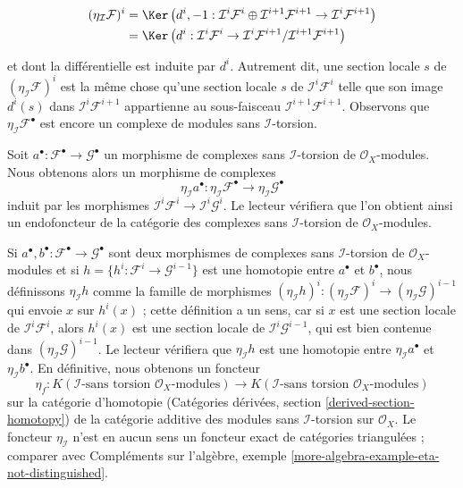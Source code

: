 \begin{align*}
(\eta_\mathcal{I}\mathcal{F})^i
& =
\Ker\left(
d^i, -1 :
\mathcal{I}^i\mathcal{F}^i \oplus \mathcal{I}^{i + 1}\mathcal{F}^{i + 1}
\to
\mathcal{I}^i\mathcal{F}^{i + 1}
\right) \\
& =
\Ker\left(d^i :
\mathcal{I}^i\mathcal{F}^i
\to
\mathcal{I}^i\mathcal{F}^{i + 1}/
\mathcal{I}^{i + 1}\mathcal{F}^{i + 1}
\right)
\end{align*}

et dont la différentielle est induite par $d^i$. Autrement dit, une section locale
$s$ de $(\eta_\mathcal{I}\mathcal{F})^i$ est la même chose qu'une section locale
$s$ de $\mathcal{I}^i\mathcal{F}^i$ telle que son image $d^i(s)$
dans $\mathcal{I}^i\mathcal{F}^{i + 1}$ appartienne au sous-faisceau
$\mathcal{I}^{i + 1}\mathcal{F}^{i + 1}$. Observons que $\eta_\mathcal{I}\mathcal{F}^\bullet$
est encore un complexe de modules sans $\mathcal{I}$-torsion.

\medskip\noindent
Soit $a^\bullet : \mathcal{F}^\bullet \to \mathcal{G}^\bullet$ un morphisme de complexes sans $\mathcal{I}$-torsion de $\mathcal{O}_X$-modules. Nous obtenons alors un morphisme de complexes $$
\eta_\mathcal{I} a^\bullet :
\eta_\mathcal{I}\mathcal{F}^\bullet
\longrightarrow
\eta_\mathcal{I}\mathcal{G}^\bullet
$$ induit par les morphismes $\mathcal{I}^i\mathcal{F}^i \to \mathcal{I}^i\mathcal{G}^i$. Le lecteur vérifiera que l'on obtient ainsi un endofoncteur de la catégorie des complexes sans $\mathcal{I}$-torsion de $\mathcal{O}_X$-modules.

\medskip\noindent

Si $a^\bullet, b^\bullet : \mathcal{F}^\bullet \to \mathcal{G}^\bullet$
sont deux morphismes de complexes sans $\mathcal{I}$-torsion de $\mathcal{O}_X$-modules et si $h = \{h^i : \mathcal{F}^i \to \mathcal{G}^{i - 1}\}$ est une homotopie entre $a^\bullet$ et $b^\bullet$, nous définissons
$\eta_\mathcal{I}h$ comme la famille de morphismes
$(\eta_\mathcal{I}h)^i : (\eta_\mathcal{I}\mathcal{F})^i \to
(\eta_\mathcal{I}\mathcal{G})^{i - 1}$
qui envoie $x$ sur $h^i(x)$ ; cette définition a un sens, car si
$x$ est une section locale de $\mathcal{I}^i\mathcal{F}^i$,
alors $h^i(x)$ est une section locale de $\mathcal{I}^i\mathcal{G}^{i - 1}$,
qui est bien contenue dans $(\eta_\mathcal{I}\mathcal{G})^{i - 1}$. Le lecteur vérifiera que $\eta_\mathcal{I}h$ est une homotopie entre $\eta_\mathcal{I}a^\bullet$ et $\eta_\mathcal{I}b^\bullet$. En définitive, nous obtenons un foncteur
$$
\eta_f :
K(\mathcal{I}\text{-sans torsion }\mathcal{O}_X\text{-modules})
\longrightarrow
K(\mathcal{I}\text{-sans torsion }\mathcal{O}_X\text{-modules})
$$
sur la catégorie d'homotopie (Catégories dérivées, section \ref{derived-section-homotopy}) de la catégorie additive des modules sans
$\mathcal{I}$-torsion sur $\mathcal{O}_X$. Le foncteur $\eta_\mathcal{I}$ n'est en aucun sens un foncteur exact de catégories triangulées ; comparer avec Compléments sur l'algèbre, exemple \ref{more-algebra-example-eta-not-distinguished}.

